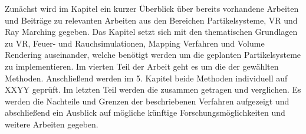Zunächst wird im Kapitel \textbf{} ein kurzer Überblick über bereits vorhandene Arbeiten
und Beiträge zu relevanten Arbeiten aus den Bereichen Partikelsysteme, VR und Ray Marching gegeben.
Das Kapitel \textbf{} setzt sich mit den thematischen Grundlagen zu VR, Feuer- und Rauchsimulationen,
Mapping Verfahren und Volume Rendering auseinander, welche benötigt werden um die geplanten Partikelsysteme zu implementieren.
Im vierten Teil der Arbeit geht es um die \textbf{} der gewählten Methoden. Anschließend werden im 5. Kapitel 
\textbf{} beide  Methoden individuell auf XXYY geprüft. Im letzten Teil werden die \textbf{} zusammen getragen 
und verglichen. Es werden die Nachteile und Grenzen der beschriebenen Verfahren aufgezeigt und abschließend ein Ausblick auf mögliche künftige 
Forschungsmöglichkeiten und weitere Arbeiten gegeben. 



\newpage
